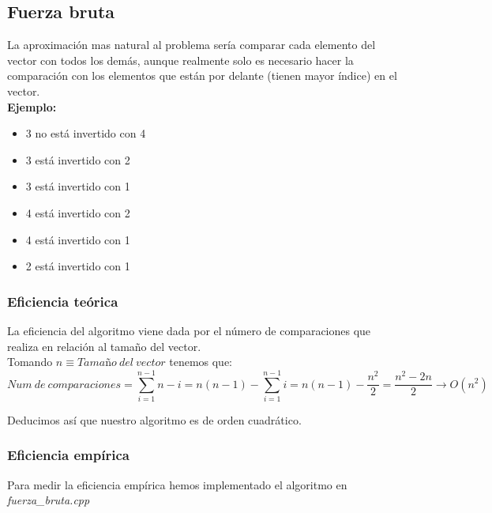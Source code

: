 \subsection{Fuerza bruta}
La aproximación mas natural al problema sería comparar cada elemento del vector con todos los demás, aunque realmente solo es necesario hacer la comparación con los elementos que están por delante (tienen mayor índice) en el vector.\\

\textbf{Ejemplo:}

\begin{center}
\end{center}

\begin{itemize}
\item 3 no está invertido con 4
\item 3 está invertido con 2
\item 3 está invertido con 1
\item 4 está invertido con 2
\item 4 está invertido con 1
\item 2 está invertido con 1
\end{itemize}

\subsubsection{Eficiencia teórica}
La eficiencia del algoritmo viene dada por el número de comparaciones que realiza en relación al tamaño del vector.\\

Tomando $n \equiv Tamaño\ del\ vector$ tenemos que:\\

$$Num\ de\ comparaciones = \sum_{i=1}^{n-1}n-i = n(n-1) - \sum_{i=1}^{n-1}i = n(n-1) - \frac{n^2}{2} = \frac{n^2 - 2n}{2} \longrightarrow O(n^2)$$

Deducimos así que nuestro algoritmo es de orden cuadrático.\\

\subsubsection{Eficiencia empírica}
Para medir la eficiencia empírica hemos implementado el algoritmo en \textit{fuerza\_bruta.cpp}\\

